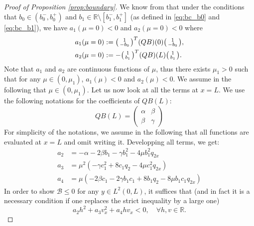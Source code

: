 \documentclass[11pt]{article}
\begin{document}
\begin{proof}[Proof of Proposition \ref{prop:boundary}]
We know from \cite{bastin2017quadratic} that under the conditions that $b_0 \in (b_0^-, b_0^+)$ and $b_1 \in \mathbb{R} \setminus [b_1^-, b_1^+]$ {(as defined in \eqref{eq:bc_b0} and \eqref{eq:bc_b1})}, 
we have $a_1(\mu=0) < 0 $ and $a_2(\mu=0) < 0$
where
\begin{align}
    a_1(\mu=0) &:= \begin{psmallmatrix}1 \\ -b_0\end{psmallmatrix}^T (QB)(0) \begin{psmallmatrix}1 \\ -b_0\end{psmallmatrix}, \\
    a_2(\mu=0) &:= -\begin{psmallmatrix}1 \\ b_1\end{psmallmatrix}^T (QB)(L) \begin{psmallmatrix}1 \\ b_1\end{psmallmatrix}.
\end{align}
Note that $a_1$ and $a_2$ are continuous functions of $\mu$, thus there exists ${\mu_1} > 0$ such that for any $\mu \in (0, {\mu_1})$, $a_1(\mu) < 0$ and $a_2(\mu) < 0$.
We assume in the following that $\mu\in(0,{\mu_1})$.
Let us now look at all the terms at $x=L$. We use the following notations for the coefficients of $QB(L)$:
\begin{equation}
\label{eq:notationM}
    QB(L) = \begin{pmatrix}
        \alpha & \beta \\ \beta & \gamma
    \end{pmatrix}
\end{equation}
For simplicity of the notations, we assume in the following that all functions are evaluated at $x=L$ and omit writing it. Developping all terms, we get:
\begin{align}
    a_2 &= -\alpha -2\beta b_1 -\gamma b_1^2 -4\mu b_1^2  q_{2x} \\
    a_3 &= \mu^2 (-\gamma c_1^2 +8 c_1 q_2 -4\mu c_1^2 q_{2x}) \\
    a_4 &= \mu (-2\beta c_1 -2\gamma b_1 c_1 +8 b_1 q_2 -8\mu b_1 c_1  q_{2x})
\end{align}
In order to show $\mathcal{B} \leq 0$ for any $y\in L^{2}(0,L)$, it suffices that (and in fact it is a necessary condition if one replaces the strict inequality by a large one)
\begin{equation}
    a_2h^2 + a_3v_x^2 + a_4 hv_x < 0, \quad \forall h,v\in\mathbb{R}.

\end{equation}
\end{proof}
\end{document}
